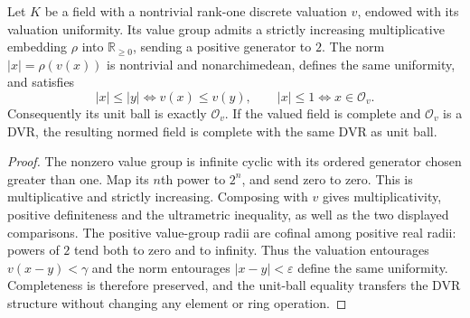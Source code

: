 \begin{lemma}
\label{fw:discrete-compatible-norm}
\leanok
Let $K$ be a field with a nontrivial rank-one discrete valuation $v$,
endowed with its valuation uniformity. Its value group admits a strictly
increasing multiplicative embedding $\rho$ into $\mathbb R_{\geq0}$,
sending a positive generator to $2$. The norm $|x|=\rho(v(x))$
is nontrivial and nonarchimedean, defines the same uniformity, and satisfies
\[
 |x|\leq|y|\iff v(x)\leq v(y),\qquad
 |x|\leq1\iff x\in\mathcal O_v.
\]
Consequently its unit ball is exactly $\mathcal O_v$. If the valued field
is complete and $\mathcal O_v$ is a DVR, the resulting normed field is
complete with the same DVR as unit ball.
\end{lemma}
\begin{proof}
The nonzero value group is infinite cyclic with its ordered generator
chosen greater than one. Map its $n$th power to $2^n$, and send zero
to zero. This is multiplicative and strictly increasing. Composing
with $v$ gives multiplicativity, positive definiteness and the
ultrametric inequality, as well as the two displayed comparisons.
The positive value-group radii are cofinal among positive real radii:
powers of $2$ tend both to zero and to infinity. Thus the valuation
entourages $v(x-y)<\gamma$ and the norm entourages $|x-y|<\varepsilon$
define the same uniformity. Completeness is therefore preserved, and
the unit-ball equality transfers the DVR structure without changing
any element or ring operation.
\end{proof}

